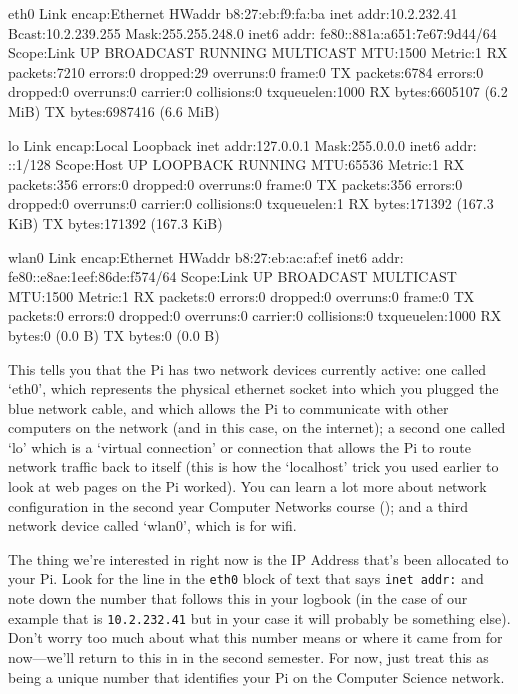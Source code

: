 \begin{ttoutenv}
eth0      Link encap:Ethernet  HWaddr b8:27:eb:f9:fa:ba  
          inet addr:10.2.232.41  Bcast:10.2.239.255  Mask:255.255.248.0
          inet6 addr: fe80::881a:a651:7e67:9d44/64 Scope:Link
          UP BROADCAST RUNNING MULTICAST  MTU:1500  Metric:1
          RX packets:7210 errors:0 dropped:29 overruns:0 frame:0
          TX packets:6784 errors:0 dropped:0 overruns:0 carrier:0
          collisions:0 txqueuelen:1000 
          RX bytes:6605107 (6.2 MiB)  TX bytes:6987416 (6.6 MiB)

lo        Link encap:Local Loopback  
          inet addr:127.0.0.1  Mask:255.0.0.0
          inet6 addr: ::1/128 Scope:Host
          UP LOOPBACK RUNNING  MTU:65536  Metric:1
          RX packets:356 errors:0 dropped:0 overruns:0 frame:0
          TX packets:356 errors:0 dropped:0 overruns:0 carrier:0
          collisions:0 txqueuelen:1 
          RX bytes:171392 (167.3 KiB)  TX bytes:171392 (167.3 KiB)

wlan0     Link encap:Ethernet  HWaddr b8:27:eb:ac:af:ef  
          inet6 addr: fe80::e8ae:1eef:86de:f574/64 Scope:Link
          UP BROADCAST MULTICAST  MTU:1500  Metric:1
          RX packets:0 errors:0 dropped:0 overruns:0 frame:0
          TX packets:0 errors:0 dropped:0 overruns:0 carrier:0
          collisions:0 txqueuelen:1000 
          RX bytes:0 (0.0 B)  TX bytes:0 (0.0 B)
\end{ttoutenv}

This tells you that the Pi has two network devices currently active:
one called `eth0', which represents the physical ethernet socket into
which you plugged the blue network cable, and which allows the Pi to
communicate with other computers on the network (and in this case, on
the internet); a second one called `lo' which is a `virtual
connection' or  connection that allows the Pi
to route network traffic back to itself (this is how the `localhost'
trick you used earlier to look at web pages on the Pi worked). You can
learn a lot more about network configuration in the second year
Computer Networks course (); and a third network
device called `wlan0', which is for wifi.

The thing we're interested in right now is the IP Address that's been
allocated to your Pi. Look for the line in the \texttt{eth0} block of
text that says \texttt{inet addr:} and note down the number that
follows this in your logbook (in the case of our example that is
\texttt{10.2.232.41} but in your case it will probably be something
else). Don't worry too much about what this number means or where it
came from for now---we'll return to this in  in
the second semester. For now, just treat this as being a unique number
that identifies your Pi on the Computer Science network.

